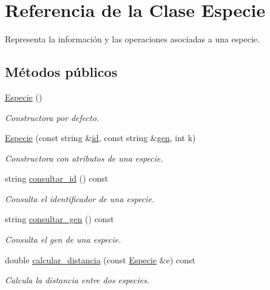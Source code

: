 \hypertarget{class_especie}{}\section{Referencia de la Clase Especie}
\label{class_especie}


Representa la información y las operaciones asociadas a una especie.  


\subsection*{Métodos públicos}
\begin{DoxyCompactItemize}
\item 
\hyperlink{class_especie_a272c2488719cc9874b2f174906675b3d}{Especie} ()
\begin{DoxyCompactList}\small\item\em Constructora por defecto. \end{DoxyCompactList}\item 
\hyperlink{class_especie_ae7e31049e2120693877ac3e8b2e42043}{Especie} (const string \&\hyperlink{class_especie_a91b94109fb8a456bba7199cdda36d588}{id}, const string \&\hyperlink{class_especie_ac35bb565f7346cd6317b3a8c849456d1}{gen}, int k)
\begin{DoxyCompactList}\small\item\em Constructora con atributos de una especie. \end{DoxyCompactList}\item 
string \hyperlink{class_especie_a1652f05cd2ff7dc71123bf538ecc4476}{consultar\+\_\+id} () const
\begin{DoxyCompactList}\small\item\em Consulta el identificador de una especie. \end{DoxyCompactList}\item 
string \hyperlink{class_especie_a850af2b59a21e2d801c59d76ba5c1a98}{consultar\+\_\+gen} () const
\begin{DoxyCompactList}\small\item\em Consulta el gen de una especie. \end{DoxyCompactList}\item 
double \hyperlink{class_especie_aeae80a0aef28e0ae808ad315a0b65408}{calcular\+\_\+distancia} (const \hyperlink{class_especie}{Especie} \&e) const
\begin{DoxyCompactList}\small\item\em Calcula la distancia entre dos especies. \end{DoxyCompactList}\item 

\end{DoxyCompactItemize}
